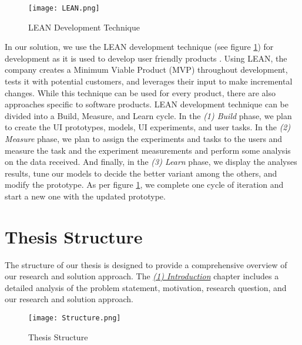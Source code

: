 \begin{figure}[ht]
    \centering
    \texttt{[image: LEAN.png]}
    \caption{LEAN Development Technique}
    \label{intro:fig:lean}
\end{figure}

In our solution, we use the LEAN development technique (see figure \ref{intro:fig:lean}) for development as it is used to develop user friendly products \cite{article:lean:hart}.
Using LEAN, the company creates a Minimum Viable Product (MVP) throughout development, tests it with potential customers, and leverages their input to make incremental changes.
While this technique can be used for every product, there are also approaches specific to software products.
LEAN development technique can be divided into a Build, Measure, and Learn cycle. 
In the \textit{(1) Build} phase, we plan to create the UI prototypes, models, UI experiments, and user tasks.
In the \textit{(2) Measure} phase, we plan to assign the experiments and tasks to the users and measure the task and the experiment measurements and perform some analysis on the data received. 
And finally, in the \textit{(3) Learn} phase, we display the analyses results, tune our models to decide the better variant among the others, and modify the prototype.
As per figure \ref{intro:fig:lean}, we complete one cycle of iteration and start a new one with the updated prototype.

\clearpage

\section{Thesis Structure}
The structure of our thesis is designed to provide a comprehensive overview of our research and solution approach.
The \textit{\hyperref[chap:introduction]{(1) Introduction}} chapter includes a detailed analysis of the problem statement, motivation, research question, and our research and solution approach.

\begin{figure}[htbp!]
    \centering
    \texttt{[image: Structure.png]}
    \caption{Thesis Structure}
    \label{intro:fig:structure}
\end{figure}

